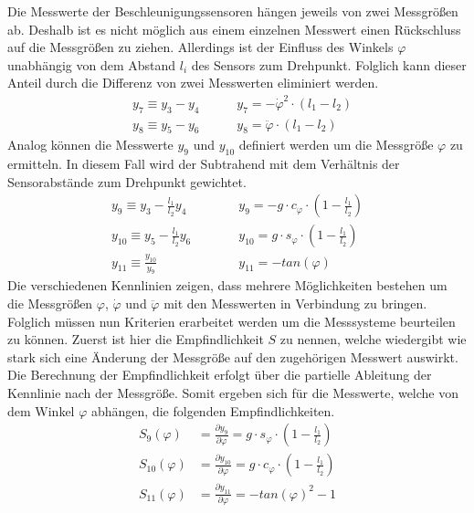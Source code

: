 Die Messwerte der Beschleunigungssensoren hängen jeweils von zwei Messgrößen ab. Deshalb ist es nicht möglich aus einem einzelnen Messwert einen Rückschluss auf die Messgrößen zu ziehen. Allerdings ist der Einfluss des Winkels $\varphi$ unabhängig von dem Abstand $l_i$ des Sensors zum Drehpunkt. Folglich kann dieser Anteil durch die Differenz von zwei Messwerten eliminiert werden.
\begin{equation}
\begin{split}
&y_7 \equiv y_3 - y_4 \hspace{35pt} y_7 = -\dot{\varphi}^2 \cdot (l_1 - l_2) \\
&y_8 \equiv y_5 - y_6 \hspace{35pt} y_8 = \ddot{\varphi} \cdot (l_1 - l_2)
\end{split}
\end{equation}
Analog können die Messwerte $y_9$ und $y_10$ definiert werden um die Messgröße $\varphi$ zu ermitteln. In diesem Fall wird der Subtrahend mit dem Verhältnis der Sensorabstände zum Drehpunkt gewichtet.
\begin{equation}
\begin{split}
y_9 \equiv y_3 - \frac{l_1}{l_2}y_4 &\hspace{35pt} y_9 = -g \cdot c_{\varphi} \cdot (1 - \frac{l_1}{l_2}) \\
y_{10} \equiv y_5 - \frac{l_1}{l_2}y_6 &\hspace{35pt} y_{10} = g \cdot s_{\varphi} \cdot (1 - \frac{l_1}{l_2}) \\
y_{11} \equiv \frac{y_{10}}{y_9}  &\hspace{35pt} y_{11} = -tan(\varphi)
\end{split}
\end{equation}
Die verschiedenen Kennlinien zeigen, dass mehrere Möglichkeiten bestehen um die Messgrößen $\varphi$, $\dot{\varphi}$ und $\ddot{\varphi}$ mit den Messwerten in Verbindung zu bringen. Folglich müssen nun Kriterien erarbeitet werden um die Messsysteme beurteilen zu können. Zuerst ist hier die Empfindlichkeit $S$ zu nennen, welche wiedergibt wie stark sich eine Änderung der Messgröße auf den zugehörigen Messwert auswirkt. Die Berechnung der Empfindlichkeit erfolgt über die partielle Ableitung der Kennlinie nach der Messgröße. Somit ergeben sich für die Messwerte, welche von dem Winkel $\varphi$ abhängen, die folgenden Empfindlichkeiten.
\begin{equation}
\begin{split}
S_9(\varphi) &= \frac{\partial y_9}{\partial \varphi} = g\cdot s_{\varphi}\cdot (1 - \frac{l_1}{l_2}) \\
S_{10}(\varphi) &= \frac{\partial y_{10}}{\partial \varphi} = g \cdot c_{\varphi} \cdot (1- \frac{l_1}{l_2}) \\
S_{11}(\varphi) &= \frac{\partial y_{11}}{\partial \varphi} = -tan(\varphi)^2 - 1
\end{split}
\end{equation}

